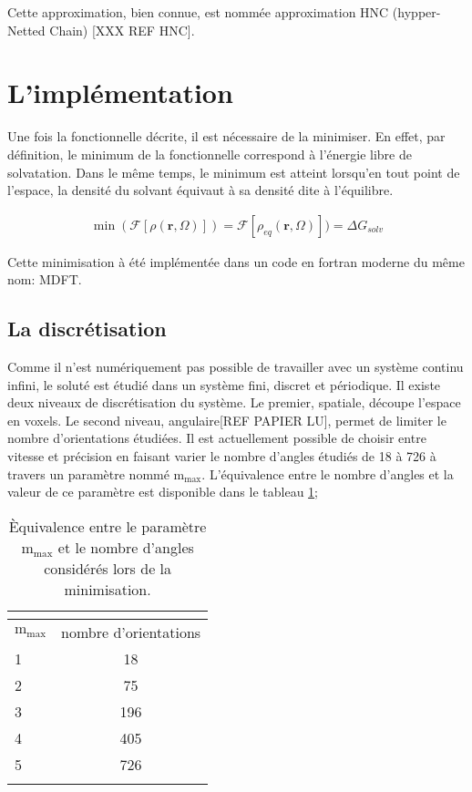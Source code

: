 Cette approximation, bien connue, est nommée approximation HNC (hypper-Netted Chain) [XXX REF HNC]. 


\section{L'implémentation}
Une fois la fonctionnelle décrite, il est nécessaire de la minimiser. En effet, par définition, le minimum de la fonctionnelle correspond à l'énergie libre de solvatation. Dans le même temps, le minimum est atteint lorsqu'en tout point de l'espace, la densité du solvant équivaut à sa densité dite à l'équilibre.

\begin{eqnarray}
\min(\mathcal{F}[\rho\left(\boldsymbol{r},\Omega \right)]) = \mathcal{F}[\rho_{eq}\left(\boldsymbol{r},\Omega \right)])= \Delta G_{solv}
\end{eqnarray}

Cette minimisation à été implémentée dans un code en fortran moderne du même nom: MDFT.


\subsection{La discrétisation}
Comme il n'est numériquement pas possible de travailler avec un système continu infini, le soluté est étudié dans un système fini, discret et périodique. Il existe deux niveaux de discrétisation du système. Le premier, spatiale, découpe l'espace en voxels. Le second niveau, angulaire[REF PAPIER LU], permet de limiter le nombre d'orientations étudiées. Il est actuellement possible de choisir entre vitesse et précision en faisant varier le nombre d'angles étudiés de 18 à 726 à travers un paramètre nommé $\mathrm{m}_\mathrm{max}$. L'équivalence entre le nombre d'angles et la valeur de ce paramètre est disponible dans le tableau \ref{tab:mmax};

\begin{table}[H]
 \centering
  \begin{tabular}{l | c }
    \hline \multicolumn{2}{c}{} \\[-1em]\hline
    $\mathrm{m}_\mathrm{max}$ & nombre d'orientations \\
    \hline
    1  & 18 \\
    2  & 75 \\
    3  & 196 \\
    4  & 405 \\
    5  & 726 \\
    \hline \multicolumn{2}{c}{} \\[-1em]\hline
  \end{tabular}
  \caption{\`Equivalence entre le paramètre $\mathrm{m}_\mathrm{max}$ et le nombre d'angles considérés lors de la minimisation.}
  \label{tab:mmax}  
\end{table}


